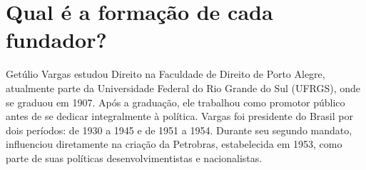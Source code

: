 \section{Qual é a formação de cada fundador?}
Getúlio Vargas estudou Direito na Faculdade de Direito de Porto Alegre, atualmente parte da Universidade Federal do Rio Grande do Sul (UFRGS), onde se graduou em 1907. Após a graduação, ele trabalhou como promotor público antes de se dedicar integralmente à política. Vargas foi presidente do Brasil por dois períodos: de 1930 a 1945 e de 1951 a 1954. Durante seu segundo mandato, influenciou diretamente na criação da Petrobras, estabelecida em 1953, como parte de suas políticas desenvolvimentistas e nacionalistas.